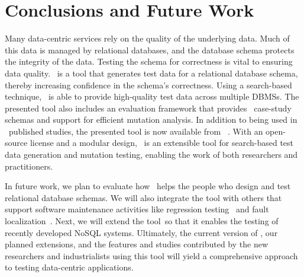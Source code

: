 \section{Conclusions and Future Work}\label{sec:conclusion}


Many data-centric services rely on the quality of the underlying data. Much of this data is managed by relational
databases, and the database schema protects the integrity of the data.  Testing the schema for correctness is vital to
ensuring data quality. \sa~is a tool that generates test data for a relational database schema, thereby increasing
confidence in the schema's correctness. Using a search-based technique, \sa~is able to provide high-quality test data
across multiple DBMSs. The presented tool also includes an evaluation framework that provides
\numprovidedschemas~case-study schemas and support for efficient mutation analysis. In addition to being used in
\numuniquepapers~published studies, the presented tool is now available from \sawebsite~\cite{tool}. With an open-source
license and a modular design, \sa~is an extensible tool for search-based test data generation and mutation testing,
enabling the work of both researchers and practitioners.


In future work, we plan to evaluate how \sa~helps the people who design and test relational database schemas. We will
also integrate the tool with others that support software maintenance activities like regression
testing~\cite{Kapfhammer2008} and fault localization~\cite{Clark2011}. Next, we will extend the tool~so that it enables
the testing of recently developed NoSQL systems. Ultimately, the current version of \sa, our planned extensions, and the
features and studies contributed by the new researchers and industrialists using this tool will yield a comprehensive
approach to testing data-centric applications.
